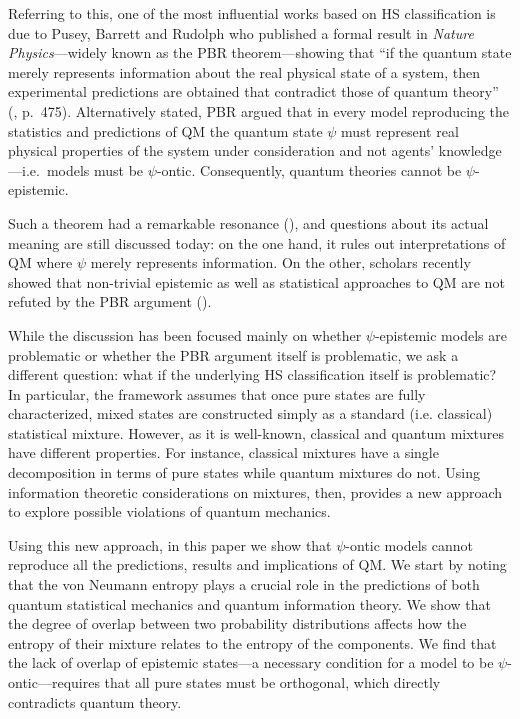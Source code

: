 \documentclass[10pt,twocolumn, nofootinbib]{revtex4-2}
\begin{document}
Referring to this, one of the most influential works based on HS classification is due to Pusey, Barrett and Rudolph who published a formal result in \emph{Nature Physics}---widely known as the PBR theorem---showing that ``if the quantum state merely represents information about the real physical state of a system, then experimental predictions are obtained that contradict those of quantum theory'' (\cite{PBR:2012}, p.\ 475). Alternatively stated, PBR argued that in every model reproducing the statistics and predictions of QM the quantum state $\psi$ must represent real physical properties of the system under consideration and not agents' knowledge---i.e.\ models must be $\psi$-ontic. Consequently, quantum theories cannot be $\psi$-epistemic. 

Such a theorem had a remarkable resonance (\cite{Leifer:2014, Leifer:2014b, Lewis:2012, Renner:2012, Colbeck:2017, Hardy:2013, Maroney:2014, Patra:2013, Mansfield:2016, Schlosshauer:2012, Schlosshauer:2013, Schlosshauer:2014, Aaronson:2013}), and questions about its actual meaning are still discussed today: on the one hand, it rules out interpretations of QM where $\psi$ merely represents information. On the other, scholars recently showed that non-trivial epistemic as well as statistical approaches to QM are not refuted by the PBR argument (\cite{Ben:2017, Rizzi:2018, Oldofredi:2021, DeBrota:2019}).

While the discussion has been focused mainly on whether $\psi$-epistemic models are problematic or whether the PBR argument itself is problematic, we ask a different question: what if the underlying HS classification itself is problematic? In particular, the framework assumes that once pure states are fully characterized, mixed states are constructed simply as a standard (i.e. classical) statistical mixture. However, as it is well-known, classical and quantum mixtures have different properties. For instance, classical mixtures have a single decomposition in terms of pure states while quantum mixtures do not. Using information theoretic considerations on mixtures, then, provides a new approach to explore possible violations of quantum mechanics.

Using this new approach, in this paper we show that $\psi$-ontic models cannot reproduce all the predictions, results and implications of QM. We start by noting that the von Neumann entropy plays a crucial role in the predictions of both quantum statistical mechanics and quantum information theory. We show that the degree of overlap between two probability distributions affects how the entropy of their mixture relates to the entropy of the components. We find that the lack of overlap of epistemic states---a necessary condition for a model to be $\psi$-ontic---requires that all pure states must be orthogonal, which directly contradicts quantum theory.
\end{document}
